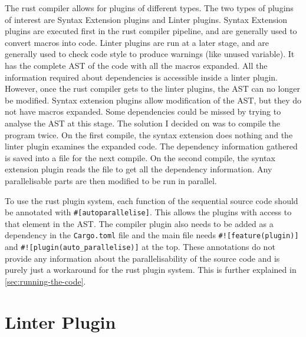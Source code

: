 The rust compiler allows for plugins of different types. The two types of plugins of interest are Syntax Extension plugins and Linter plugins. Syntax Extension plugins are executed first in the rust compiler pipeline, and are generally used to convert macros into code. Linter plugins are run at a later stage, and are generally used to check code style to produce warnings (like unused variable). It has the complete AST of the code with all the macros expanded. All the information required about dependencies is accessible inside a linter plugin. However, once the rust compiler gets to the linter plugins, the AST can no longer be modified. Syntax extension plugins allow modification of the AST, but they do not have macros expanded. Some dependencies could be missed by trying to analyse the AST at this stage. The solution I decided on was to compile the program twice. On the first compile, the syntax extension does nothing and the linter plugin examines the expanded code. The dependency information gathered is saved into a file for the next compile. On the second compile, the syntax extension plugin reads the file to get all the dependency information. Any parallelisable parts are then modified to be run in parallel.

To use the rust plugin system, each function of the sequential source code should be annotated with \texttt{\#[autoparallelise]}. This allows the plugins with access to that element in the AST. The compiler plugin also needs to be added as a dependency in the \texttt{Cargo.toml} file and the main file needs \texttt{\#![feature(plugin)]} and \texttt{\#![plugin(auto\_parallelise)]} at the top. These annotations do not provide any information about the parallelisability of the source code and is purely just a workaround for the rust plugin system. This is further explained in \autoref{sec:running-the-code}.

\section{Linter Plugin}


